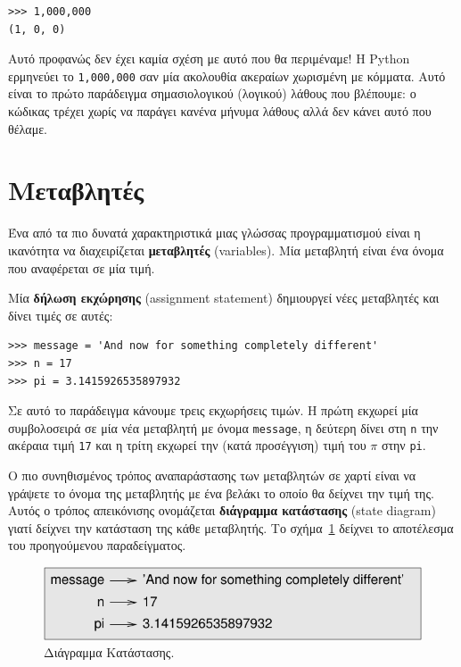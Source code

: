 \documentclass[10pt]{book}
\begin{document}
\begin{verbatim}
>>> 1,000,000
(1, 0, 0)
\end{verbatim}
%

Αυτό προφανώς δεν έχει καμία σχέση με αυτό που θα περιμέναμε! Η
Python ερμηνεύει το {\tt 1,000,000} σαν μία ακολουθία ακεραίων χωρισμένη με κόμματα. Αυτό είναι το πρώτο παράδειγμα σημασιολογικού (λογικού) λάθους που βλέπουμε: ο κώδικας τρέχει χωρίς να παράγει κανένα μήνυμα
λάθους αλλά δεν κάνει αυτό που θέλαμε.



\section{Μεταβλητές}
\label{variables}
Ένα από τα πιο δυνατά χαρακτηριστικά μιας γλώσσας προγραμματισμού
είναι η ικανότητα να διαχειρίζεται {\bf μεταβλητές} (variables). Μία μεταβλητή είναι ένα όνομα που αναφέρεται σε μία τιμή.

Μία {\bf δήλωση εκχώρησης} (assignment statement) δημιουργεί νέες μεταβλητές και δίνει τιμές σε αυτές:

\begin{verbatim}
>>> message = 'And now for something completely different'
>>> n = 17
>>> pi = 3.1415926535897932
\end{verbatim}
%

Σε αυτό το παράδειγμα κάνουμε τρεις εκχωρήσεις τιμών. Η πρώτη εκχωρεί
μία συμβολοσειρά σε μία νέα μεταβλητή με όνομα {\tt message}, 
η δεύτερη δίνει στη {\tt n} την ακέραια τιμή {\tt 17} και
η τρίτη εκχωρεί την (κατά προσέγγιση) τιμή του $\pi$ στην {\tt pi}.

Ο πιο συνηθισμένος τρόπος αναπαράστασης των μεταβλητών σε χαρτί είναι να γράψετε το όνομα της μεταβλητής με ένα βελάκι το οποίο θα δείχνει την τιμή της. Αυτός ο τρόπος απεικόνισης ονομάζεται {\bf διάγραμμα κατάστασης} (state diagram) γιατί δείχνει την κατάσταση της κάθε μεταβλητής. Το σχήμα~\ref{fig.state2} δείχνει το αποτέλεσμα του προηγούμενου παραδείγματος.

\begin{figure}
\centerline
{\includegraphics[scale=0.8]{figs/state2.pdf}}
\caption{Διάγραμμα Κατάστασης.}
\label{fig.state2}
\end{figure}
\end{document}
